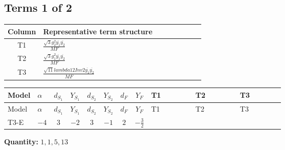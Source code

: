 \documentclass[8pt]{article}
\begin{document}
\begin{landscape}
\subsection*{Terms 1 of 2}
\begin{center}
\begin{tabular}{@{}c >{\raggedright\arraybackslash}p{0.82\linewidth}@{}}
\toprule
Column & Representative term structure \\
\midrule
T1 & \(\displaystyle \frac{\sqrt{3} g_{2}^{2} \overline{y_{1}} \overline{y_{2}}}{MF}\) \\
\midrule
T2 & \(\displaystyle \frac{\sqrt{3} g_{1}^{2} \overline{y_{1}} \overline{y_{2}}}{MF}\) \\
\midrule
T3 & \(\displaystyle \frac{\sqrt{11} lambda12Inv2 \overline{y_{1}} \overline{y_{2}}}{MF}\) \\
\midrule
\bottomrule
\end{tabular}
\end{center}
\smallskip
\tiny
\begin{longtable}{@{}llcccccc >{\raggedright\arraybackslash}p{0.21\linewidth} >{\raggedright\arraybackslash}p{0.21\linewidth} >{\raggedright\arraybackslash}p{0.21\linewidth}@{}}
\toprule
Model & $\alpha$ & $d_{S_1}$ & $Y_{S_1}$ & $d_{S_2}$ & $Y_{S_2}$ & $d_F$ & $Y_F$ & T1 & T2 & T3 \\
\midrule
\endfirsthead
\toprule
Model & $\alpha$ & $d_{S_1}$ & $Y_{S_1}$ & $d_{S_2}$ & $Y_{S_2}$ & $d_F$ & $Y_F$ & T1 & T2 & T3 \\
\midrule
\endhead
T3-E & $-4$ & $3$ & $-2$ & $3$ & $-1$ & $2$ & $-\frac{3}{2}$ & \scriptsize\adjustbox{max width=\linewidth}{$\begin{gathered} - \frac{11 \sqrt{3} g_{2}^{2} \overline{y_{1}} \overline{y_{2}}}{8 MF}\end{gathered}$} & \scriptsize\adjustbox{max width=\linewidth}{$\begin{gathered} - \frac{9 \sqrt{3} g_{1}^{2} \overline{y_{1}} \overline{y_{2}}}{8 MF}\end{gathered}$} & \scriptsize\adjustbox{max width=\linewidth}{$\begin{gathered} - \frac{3 \sqrt{11} lambda12Inv2 \overline{y_{1}} \overline{y_{2}}}{22 MF}\end{gathered}$} \\
\midrule
\bottomrule
\end{longtable}
\clearpage
\noindent\textbf{Quantity: }$\mathrm{1,1,5,13}$\par\smallskip

\end{landscape}
\end{document}
